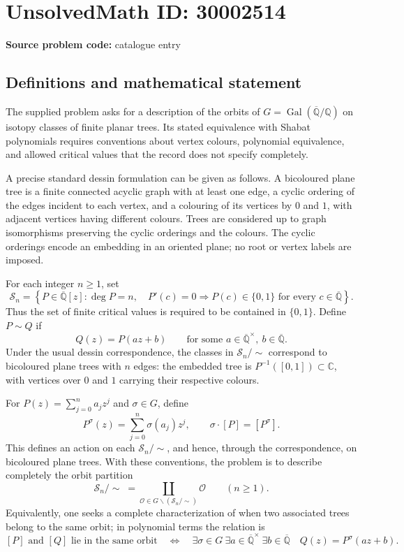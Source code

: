 \documentclass[11pt]{article}
\newcommand{\Q}{\mathbb{Q}}
\newcommand{\C}{\mathbb{C}}
\begin{document}
\section*{UnsolvedMath ID: 30002514}
\textbf{Source problem code:} catalogue entry
\subsection{Definitions and mathematical statement}
The supplied problem asks for a description of the orbits of \(G=\operatorname{Gal}(\overline{\Q}/\Q)\) on isotopy classes of finite planar trees. Its stated equivalence with Shabat polynomials requires conventions about vertex colours, polynomial equivalence, and allowed critical values that the record does not specify completely.

A precise standard dessin formulation can be given as follows. A bicoloured plane tree is a finite connected acyclic graph with at least one edge, a cyclic ordering of the edges incident to each vertex, and a colouring of its vertices by \(0\) and \(1\), with adjacent vertices having different colours. Trees are considered up to graph isomorphisms preserving the cyclic orderings and the colours. The cyclic orderings encode an embedding in an oriented plane; no root or vertex labels are imposed.

For each integer \(n\geq 1\), set
\[
\mathcal S_n=\left\{P\in\overline{\Q}[z]:\deg P=n,\quad P'(c)=0\Longrightarrow P(c)\in\{0,1\}\text{ for every }c\in\overline{\Q}\right\}.
\]
Thus the set of finite critical values is required to be contained in \(\{0,1\}\). Define \(P\sim Q\) if
\[
Q(z)=P(az+b)\qquad\text{for some }a\in\overline{\Q}^{\times},\ b\in\overline{\Q}.
\]
Under the usual dessin correspondence, the classes in \(\mathcal S_n/\!\sim\) correspond to bicoloured plane trees with \(n\) edges: the embedded tree is \(P^{-1}([0,1])\subset\C\), with vertices over \(0\) and \(1\) carrying their respective colours.

For \(P(z)=\sum_{j=0}^n a_jz^j\) and \(\sigma\in G\), define
\[
P^\sigma(z)=\sum_{j=0}^n\sigma(a_j)z^j,
\qquad \sigma\cdot[P]=[P^\sigma].
\]
This defines an action on each \(\mathcal S_n/\!\sim\), and hence, through the correspondence, on bicoloured plane trees. With these conventions, the problem is to describe completely the orbit partition
\[
\mathcal S_n/\!\sim\;=\coprod_{\mathcal O\in G\backslash(\mathcal S_n/\!\sim)}\mathcal O
\qquad(n\geq1).
\]
Equivalently, one seeks a complete characterization of when two associated trees belong to the same orbit; in polynomial terms the relation is
\[
[P]\text{ and }[Q]\text{ lie in the same orbit}
\quad\Longleftrightarrow\quad
\exists\sigma\in G\ \exists a\in\overline{\Q}^{\times}\ \exists b\in\overline{\Q}\quad
Q(z)=P^\sigma(az+b).
\]
\end{document}

